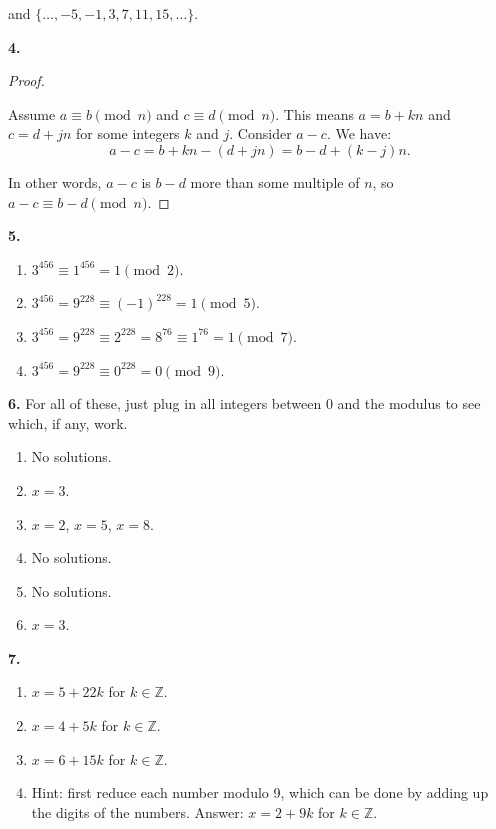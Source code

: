 \documentclass[10pt,]{book}
\theoremstyle{plain}
\theoremstyle{definition}
\theoremstyle{definition}
\theoremstyle{definition}
\numberwithin{equation}{chapter}
\def\Z{\mathbb Z}
\begin{document}
and \(\{\ldots, -5, -1, 3, 7, 11, 15, \ldots\}\).
%
\par\smallskip
\noindent\textbf{4.}\quad{}\begin{proof}\hypertarget{proof-66}{}

Assume \(a \equiv b \pmod n\) and \(c \equiv d \pmod n\). This means \(a = b + kn\) and \(c = d + jn\) for some integers \(k\) and \(j\). Consider \(a-c\). We have:
\begin{equation*}
  a-c = b+kn - (d+jn) = b-d + (k-j)n.
\end{equation*}
%
\par

In other words, \(a-c\) is \(b-d\) more than some multiple of \(n\), so \(a-c \equiv b-d \pmod n\).
%
\end{proof}
\par\smallskip
\noindent\textbf{5.}\quad{}\leavevmode%
\begin{enumerate}[label=(\alph*)]
\item\hypertarget{li-1413}{}\(3^{456} \equiv 1^{456} = 1 \pmod 2\).%
\item\hypertarget{li-1414}{}\(3^{456} = 9^{228} \equiv (-1)^{228} = 1 \pmod{5}\).%
\item\hypertarget{li-1415}{}\(3^{456} = 9^{228} \equiv 2^{228} = 8^{76} \equiv 1^{76} = 1 \pmod 7\).%
\item\hypertarget{li-1416}{}\(3^{456} = 9^{228} \equiv 0^{228} = 0 \pmod{9}\).%
\end{enumerate}
\par\smallskip
\noindent\textbf{6.}\quad{}
For all of these, just plug in all integers between 0 and the modulus to see which, if any, work.
%
\leavevmode%
\begin{enumerate}[label=(\alph*)]
\item\hypertarget{li-1423}{}
No solutions.
%
\item\hypertarget{li-1424}{}\(x = 3\).%
\item\hypertarget{li-1425}{}\(x = 2\), \(x = 5\), \(x = 8\).%
\item\hypertarget{li-1426}{}
No solutions.
%
\item\hypertarget{li-1427}{}
No solutions.
%
\item\hypertarget{li-1428}{}\(x = 3\).%
\end{enumerate}
\par\smallskip
\noindent\textbf{7.}\quad{}\leavevmode%
\begin{enumerate}[label=(\alph*)]
\item\hypertarget{li-1433}{}\(x = 5+22k\) for \(k \in \Z\).%
\item\hypertarget{li-1434}{}\(x = 4 + 5k\) for \(k \in \Z\).%
\item\hypertarget{li-1435}{}\(x = 6 + 15k\) for \(k \in \Z\).%
\item\hypertarget{li-1436}{}
Hint: first reduce each number modulo 9, which can be done by adding up the digits of the numbers.  Answer: \(x = 2 + 9k\) for \(k \in \Z\).
%
\end{enumerate}
\end{document}
